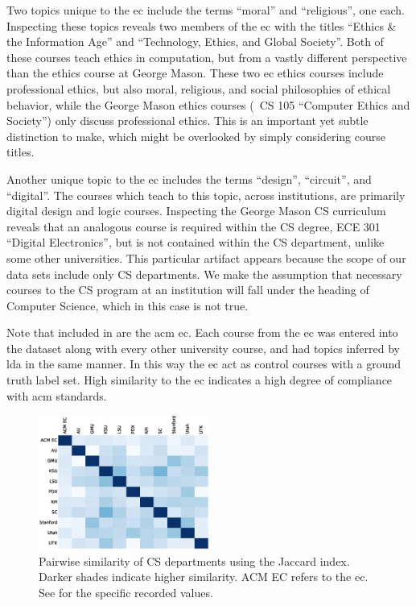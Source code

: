 
Two topics unique to the \ac{ec} include the terms ``moral'' and ``religious'', one each.
Inspecting these topics reveals two members of the \ac{ec} with the titles ``Ethics \& the Information Age'' and ``Technology, Ethics, and Global Society''.
Both of these courses teach ethics in computation, but from a vastly different perspective than the ethics course at George Mason.
These two \ac{ec} ethics courses include professional ethics, but also moral, religious, and social philosophies of ethical behavior, while the George Mason ethics courses (\eg\ CS 105 ``Computer Ethics and Society'') only discuss professional ethics.
This is an important yet subtle distinction to make, which might be overlooked by simply considering course titles.


Another unique topic to the \ac{ec} includes the terms ``design'', ``circuit'', and ``digital''.
The courses which teach to this topic, across institutions, are primarily digital design and logic courses.
Inspecting the George Mason CS curriculum reveals that an analogous course is required within the CS degree, ECE 301 ``Digital Electronics'', but is not contained within the CS department, unlike some other universities.
This particular artifact appears because the scope of our data sets include only CS departments.
We make the assumption that necessary courses to the CS program at an institution will fall under the heading of Computer Science, which in this case is not true.


Note that included in  are the \ac{acm} \ac{ec}.
Each course from the \ac{ec} was entered into the dataset along with every other university course, and had topics inferred by \ac{lda} in the same manner.
In this way the \ac{ec} act as control courses with a ground truth label set.
High similarity to the \ac{ec} indicates a high degree of compliance with \ac{acm} standards.


\begin{figure}
  \centering
  \includegraphics[width=0.5\textwidth]{figures/10by10heatmap}
  \caption{Pairwise similarity of CS departments using the Jaccard index. Darker shades indicate higher similarity. ACM EC refers to the \acf{ec}. See  for the specific recorded values.\label{fig:heatmap}}
\end{figure}

